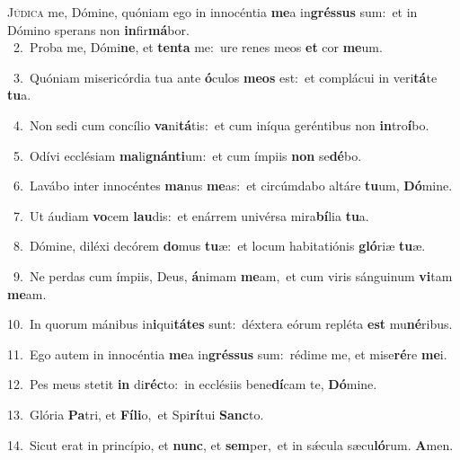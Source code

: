 \lettrine{\initial\textcolor{\initialcolor}{J}}{údica} me, Dómine, quóniam ego in innocéntia \textbf{me}\-a in\-\textbf{grés}\-\textbf{sus} sum:~\star et in Dómino sperans non \textbf{in}\-fir\-\textbf{má}\-bor.\\
{\numbfont\textcolor{\numbcolor}{~2.}}~Proba me, Dómi\-\textbf{ne}\-, et \textbf{ten}\-\textbf{ta} me:~\star ure renes meos \textbf{et} cor \textbf{me}\-um.\par
{\numbfont\textcolor{\numbcolor}{~3.}}~Quóniam misericórdia tua ante \textbf{ó}\-culos \textbf{me}\-\textbf{os} est:~\star et complácui in veri\-\textbf{tá}\-te \textbf{tu}\-a.\par
{\numbfont\textcolor{\numbcolor}{~4.}}~Non sedi cum concílio \textbf{va}\-ni\-\textbf{tá}\-tis:~\star et cum iníqua geréntibus non \textbf{in}\-tro\-\textbf{í}\-bo.\par
{\numbfont\textcolor{\numbcolor}{~5.}}~Odívi ecclésiam \textbf{ma}\-li\-\textbf{gnán}\-\textbf{ti}um:~\star et cum ímpiis \textbf{non} se\-\textbf{dé}\-bo.\par
{\numbfont\textcolor{\numbcolor}{~6.}}~Lavábo inter innocéntes \textbf{ma}\-nus \textbf{me}\-as:~\star et circúmdabo altáre \textbf{tu}\-um, \textbf{Dó}\-mine.\par
{\numbfont\textcolor{\numbcolor}{~7.}}~Ut áudiam \textbf{vo}\-cem \textbf{lau}\-dis:~\star et enárrem univérsa mira\-\textbf{bí}\-lia \textbf{tu}\-a.\par
{\numbfont\textcolor{\numbcolor}{~8.}}~Dómine, diléxi decórem \textbf{do}\-mus \textbf{tu}\-æ:~\star et locum habitatiónis \textbf{gló}\-riæ \textbf{tu}\-æ.\par
{\numbfont\textcolor{\numbcolor}{~9.}}~Ne perdas cum ímpiis, Deus, \textbf{á}\-nimam \textbf{me}\-am,~\star et cum viris sánguinum \textbf{vi}\-tam \textbf{me}\-am.\par
{\numbfont\textcolor{\numbcolor}{10.}}~In quorum mánibus in\-\textbf{i}\-qui\-\textbf{tá}\-\textbf{tes} sunt:~\star déxtera eórum repléta \textbf{est} mu\-\textbf{né}\-ribus.\par
{\numbfont\textcolor{\numbcolor}{11.}}~Ego autem in innocéntia \textbf{me}\-a in\-\textbf{grés}\-\textbf{sus} sum:~\star rédime me, et mise\-\textbf{ré}\-re \textbf{me}\-i.\par
{\numbfont\textcolor{\numbcolor}{12.}}~Pes meus stetit \textbf{in} di\-\textbf{réc}\-to:~\star in ecclésiis bene\-\textbf{dí}\-cam te, \textbf{Dó}\-mine.\par
{\numbfont\textcolor{\numbcolor}{13.}}~Glória \textbf{Pa}\-tri, et \textbf{Fí}\-\textbf{li}o,~\star et Spi\-\textbf{rí}\-tui \textbf{Sanc}\-to.\par
{\numbfont\textcolor{\numbcolor}{14.}}~Sicut erat in princípio, et \textbf{nunc}\-, et \textbf{sem}\-per,~\star et in sǽcula sæcu\-\textbf{ló}\-rum. \textbf{A}\-men.\par
